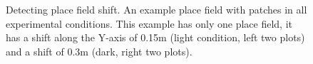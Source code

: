 \begin{figure}
\captionsetup{format=plain}
\caption[Field Shift Detection]{
Detecting place field shift. An example place field with patches in all experimental conditions. This example has only one place field, it has a shift along the Y-axis of 0.15m (light condition, left two plots) and a shift of 0.3m (dark, right two plots).
}
\label{fig:F36_shift_detection}
\end{figure}
